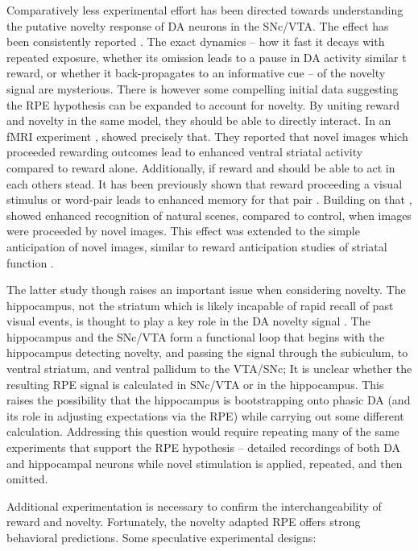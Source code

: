 \documentclass[doc]{apa}        %
\begin{document}
Comparatively less experimental effort has been directed towards understanding the putative novelty response of DA neurons in the SNc/VTA.  The effect has been consistently reported \cite{Reed:1996p7250,Blatter:2006p6372}.  The exact dynamics -- how it fast it decays with repeated exposure, whether its omission leads to a pause in DA activity similar t reward, or whether it back-propagates to an informative cue -- of the novelty signal are mysterious.  There is however some compelling initial data suggesting the RPE hypothesis can be expanded to account for novelty.  By uniting reward and novelty in the same model, they should be able to directly interact.  In an fMRI experiment , showed precisely that.  They reported that novel images which proceeded rewarding outcomes lead to enhanced ventral striatal activity compared to reward alone.  Additionally, if reward and should be able to act in each others stead.  It has been previously shown that reward proceeding a visual stimulus or word-pair leads to enhanced memory for that pair \cite{Lisman:2005p5455}.  Building on that , showed enhanced recognition of natural scenes, compared to control, when images were proceeded by novel images.  This effect was extended to the simple anticipation of novel images, similar to reward anticipation studies of striatal function \cite{Knutson:2001p5234}.

The latter study though raises an important issue when considering novelty.  The hippocampus, not the striatum which is likely incapable of rapid recall of past visual events, is thought to play a key role in the DA novelty signal \cite{Lisman:2005p5455}.  The hippocampus and the SNc/VTA form a functional loop that begins with the hippocampus detecting novelty, and passing the signal through the subiculum, to ventral striatum, and ventral pallidum to the VTA/SNc; It is unclear whether the resulting RPE signal is calculated in SNc/VTA or in the hippocampus.  This raises the possibility that the hippocampus is bootstrapping onto phasic DA (and its role in adjusting expectations via the RPE) while carrying out some different calculation.  Addressing this question would require repeating many of the same experiments that support the RPE hypothesis -- detailed recordings of both DA and hippocampal neurons while novel stimulation is applied, repeated, and then omitted.

Additional experimentation is necessary to confirm the interchangeability of reward and novelty.  Fortunately, the novelty adapted RPE offers strong behavioral predictions.  Some speculative experimental designs: 
\end{document}
